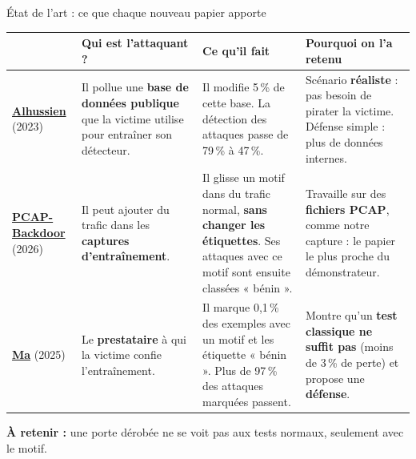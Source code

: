 \documentclass[aspectratio=169,11pt,xcolor=table]{beamer}
\begin{document}
\begin{frame}{État de l'art : ce que chaque nouveau papier apporte}
  \footnotesize
  \renewcommand{\arraystretch}{1.2}
  \begin{tabularx}{\linewidth}{@{}>{\raggedright\arraybackslash}p{.15\linewidth}*{3}{>{\raggedright\arraybackslash}X}@{}}
    \toprule
    & \textbf{Qui est l'attaquant ?} & \textbf{Ce qu'il fait} & \textbf{Pourquoi on l'a retenu} \\
    \midrule
    \textbf{\href{https://doi.org/10.1109/NOMS56928.2023.10154453}{Alhussien}} (2023)
      & Il pollue une \textbf{base de données publique} que la victime utilise pour entraîner son détecteur.
      & Il modifie 5\,\% de cette base. La détection des attaques passe de 79\,\% à 47\,\%.
      & Scénario \textbf{réaliste} : pas besoin de pirater la victime. Défense simple : plus de données internes. \\
    \textbf{\href{https://doi.org/10.1145/3805033}{PCAP-Backdoor}} (2026)
      & Il peut ajouter du trafic dans les \textbf{captures d'entraînement}.
      & Il glisse un motif dans du trafic normal, \textbf{sans changer les étiquettes}. Ses attaques avec ce motif sont ensuite classées « bénin ».
      & Travaille sur des \textbf{fichiers PCAP}, comme notre capture : le papier le plus proche du démonstrateur. \\
    \textbf{\href{https://doi.org/10.1049/ise2/6664900}{Ma}} (2025)
      & Le \textbf{prestataire} à qui la victime confie l'entraînement.
      & Il marque 0,1\,\% des exemples avec un motif et les étiquette « bénin ». Plus de 97\,\% des attaques marquées passent.
      & Montre qu'un \textbf{test classique ne suffit pas} (moins de 3\,\% de perte) et propose une \textbf{défense}. \\
    \bottomrule
  \end{tabularx}
  \vfill
  \normalsize
  \textbf{À retenir :} une porte dérobée ne se voit pas aux tests normaux, seulement avec le motif.
\end{frame}
\end{document}
